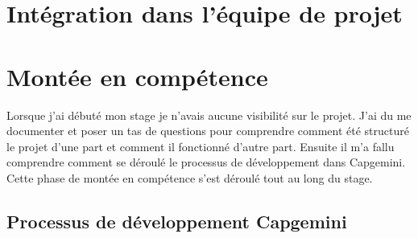 \chapter{Intégration dans l'équipe de projet}

\chapter{Montée en compétence}
Lorsque j'ai débuté mon stage je n'avais aucune visibilité sur le projet.
J'ai du me documenter et poser un tas de questions pour comprendre comment été structuré le projet d'une part et comment il fonctionné d'autre part. Ensuite il m'a fallu comprendre comment se déroulé le processus de développement dans Capgemini.
Cette phase de montée en compétence s'est déroulé tout au long du stage.

\section{Processus de développement Capgemini}
